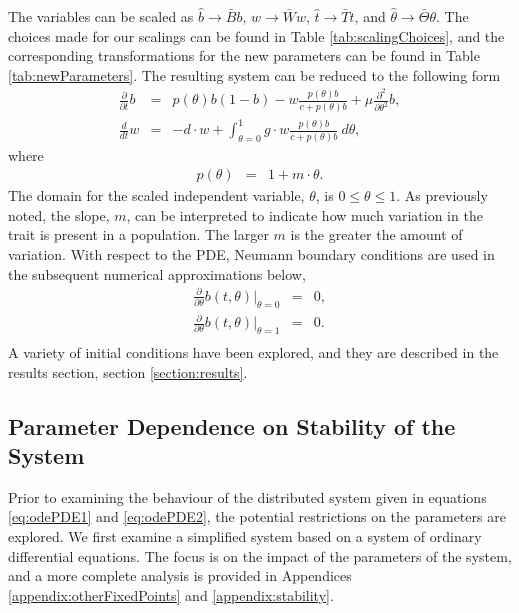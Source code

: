 \documentclass[review]{elsarticle}
\newcommand{\origB}{\hat{b}}
\newcommand{\origW}{\hat{w}}
\newcommand{\origTheta}{\hat{\theta}}
\newcommand{\origT}{\hat{t}}
\begin{document}
The variables can be scaled as $\origB\rightarrow \bar{B}b$,
$\origW\rightarrow \bar{W}w$, $\origT\rightarrow \bar{T}t$, and
$\origTheta\rightarrow \bar{\Theta}\theta$. The choices made for our
scalings can be found in Table \ref{tab:scalingChoices}, and the
corresponding transformations for the new parameters can be found in
Table \ref{tab:newParameters}.  The resulting system can be reduced to
the following form
\begin{eqnarray}
  \label{eq:scaledodePDE1}
  \frac{\partial}{\partial t} b & = &
      p(\theta) b (1 - b)
      -  w \frac{p(\theta) b}{c+p(\theta)b}
      + \mu \frac{\partial^2}{\partial \theta^2} b , \\
  \label{eq:scaledodePDE2}
  \frac{d}{dt} w & = & -d \cdot w +
      \int^1_{\theta=0} g \cdot w \frac{p(\theta) b }{c + p(\theta) b} ~ d\theta,
\end{eqnarray}
where
\begin{eqnarray}
  p(\theta) & = & 1 + m \cdot \theta.
\end{eqnarray}
The domain for the scaled independent variable, $\theta$, is
$0\leq\theta\leq 1$. As previously noted, the slope, $m$, can be
interpreted to indicate how much variation in the trait is present in
a population. The larger $m$ is the greater the amount of variation.
With respect to the PDE, Neumann boundary conditions are used in the
subsequent numerical approximations below,
\begin{eqnarray*}
  \frac{\partial}{\partial\theta} b(t,\theta) \bigg|_{\theta=0} & = & 0, \\
  \frac{\partial}{\partial\theta} b(t,\theta) \bigg|_{\theta=1} & = & 0. \\
\end{eqnarray*}
A variety of initial
conditions have been explored, and they are described in the results
section, section \ref{section:results}.


\subsection{Parameter Dependence on Stability of the System}
\label{subsection:parameters}

Prior to examining the behaviour of the distributed system given in
equations \ref{eq:odePDE1} and \ref{eq:odePDE2}, the potential
restrictions on the parameters are explored. We first examine a
simplified system based on a system of ordinary differential
equations.  The focus is on the impact of the parameters of the
system, and a more complete analysis is provided in Appendices
\ref{appendix:otherFixedPoints} and \ref{appendix:stability}.
\end{document}
